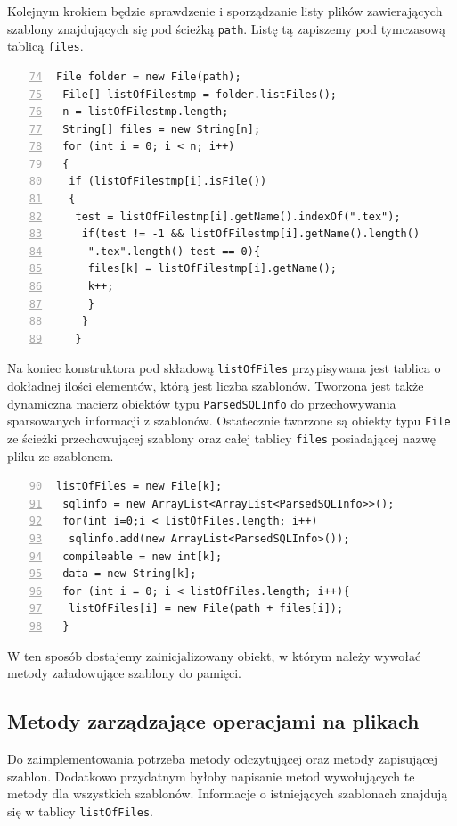     
    Kolejnym krokiem będzie sprawdzenie i sporządzanie listy plików zawierających szablony znajdujących się pod ścieżką \texttt{path}. Listę tą zapiszemy pod tymczasową tablicą  \texttt{files}.
 \begin{lstlisting}[numbers=left,firstnumber=74]
 File folder = new File(path);
 File[] listOfFilestmp = folder.listFiles(); 
 n = listOfFilestmp.length;
 String[] files = new String[n];
 for (int i = 0; i < n; i++) 
 {
  if (listOfFilestmp[i].isFile()) 
  {
   test = listOfFilestmp[i].getName().indexOf(".tex");
    if(test != -1 && listOfFilestmp[i].getName().length()
    -".tex".length()-test == 0){
     files[k] = listOfFilestmp[i].getName();
     k++;
     }
    }
   }
\end{lstlisting}


Na koniec konstruktora pod składową \texttt{listOfFiles} przypisywana jest tablica o dokładnej ilości elementów, którą jest liczba szablonów. Tworzona jest także dynamiczna macierz obiektów typu \texttt{ParsedSQLInfo} do przechowywania sparsowanych informacji z szablonów. Ostatecznie tworzone są obiekty typu \texttt{File} ze ścieżki przechowującej szablony oraz całej tablicy \texttt{files} posiadającej nazwę pliku ze szablonem.
    
 \begin{lstlisting}[numbers=left,firstnumber=90]
 listOfFiles = new File[k];
 sqlinfo = new ArrayList<ArrayList<ParsedSQLInfo>>();
 for(int i=0;i < listOfFiles.length; i++)
  sqlinfo.add(new ArrayList<ParsedSQLInfo>());
 compileable = new int[k];
 data = new String[k];
 for (int i = 0; i < listOfFiles.length; i++){
  listOfFiles[i] = new File(path + files[i]);
 }
\end{lstlisting}
  
  W ten sposób dostajemy zainicjalizowany obiekt, w którym należy wywołać metody załadowujące szablony do pamięci.
  
  
\subsection{Metody zarządzające operacjami na plikach}

Do zaimplementowania potrzeba metody odczytującej oraz metody zapisującej szablon. Dodatkowo przydatnym byłoby napisanie metod wywołujących te metody dla wszystkich szablonów. Informacje o istniejących szablonach znajdują się w tablicy \texttt{listOfFiles}. \\
\par

